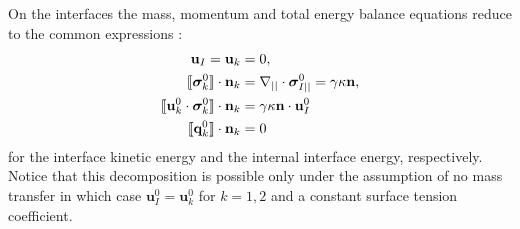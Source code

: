 On the interfaces the mass, momentum and total energy balance equations reduce to the common expressions :
\begin{align}
    \label{eq:dt_rho_I}
    \textbf{u}_I = \textbf{u}_k
    &=0, \\
    \llbracket \bm{\sigma}_k^0 \rrbracket \cdot \textbf{n}_k 
    &=
    \mathbf{\nabla}_{||}\cdot\bm\sigma^0_{I||}
    =
    \gamma\kappa\textbf{n},
    \label{eq:surface_tension}\\
    \label{eq:dt_rhoI_uI2}
    \llbracket \textbf{u}_k^0 \cdot \bm{\sigma}_k^0 \rrbracket \cdot \textbf{n}_k
    &=
     \gamma\kappa\textbf{n}\cdot \textbf{u}_{I}^0\\
    \label{eq:dt_rhoIe_I}
    \llbracket  \textbf{q}_k^0 \rrbracket \cdot \textbf{n}_k
    &= 
     0
\end{align}
for the interface kinetic energy and the internal interface energy, respectively. 
Notice that this decomposition is possible only under the assumption of no mass transfer in which case $\textbf{u}_I^0=\textbf{u}_k^0$ for $k =1,2$ and a constant surface tension coefficient.

